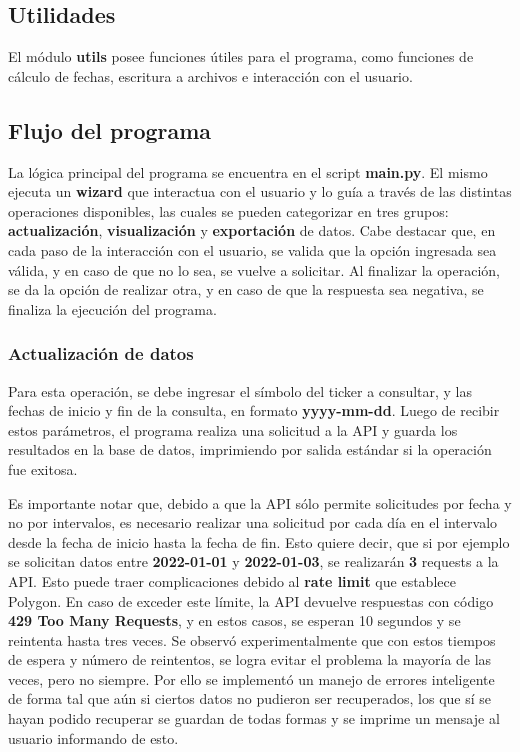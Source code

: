 \documentclass{article}
\begin{document}
\subsection{Utilidades}
El módulo \textbf{utils} posee funciones útiles para el programa, como funciones de cálculo de
fechas, escritura a archivos e interacción con el usuario.

\subsection{Flujo del programa}
La lógica principal del programa se encuentra en el script \textbf{main.py}. El mismo ejecuta
un \textbf{wizard} que interactua con el usuario y lo guía a través de las distintas operaciones
disponibles, las cuales se pueden categorizar en tres grupos: \textbf{actualización},
\textbf{visualización} y \textbf{exportación} de datos. Cabe destacar que, en cada paso de la
interacción con el usuario, se valida que la opción ingresada sea válida, y en caso de que no lo sea,
se vuelve a solicitar. Al finalizar la operación, se da la opción de realizar otra, y en caso de que
la respuesta sea negativa, se finaliza la ejecución del programa.

\subsubsection{Actualización de datos}
Para esta operación, se debe ingresar el símbolo del ticker a consultar, y las fechas
de inicio y fin de la consulta, en formato \textbf{yyyy-mm-dd}. Luego de recibir estos parámetros,
el programa realiza una solicitud a la API y guarda los resultados en la base de datos, imprimiendo
por salida estándar si la operación fue exitosa.

Es importante notar que, debido a que la API sólo
permite solicitudes por fecha y no por intervalos, es necesario realizar una solicitud por cada día
en el intervalo desde la fecha de inicio hasta la fecha de fin. Esto quiere decir, que si por ejemplo
se solicitan datos entre \textbf{2022-01-01} y \textbf{2022-01-03}, se realizarán \textbf{3} requests
a la API. Esto puede traer complicaciones debido al \textbf{rate limit} que establece Polygon. En
caso de exceder este límite, la API devuelve respuestas con código \textbf{429 Too Many Requests},
y en estos casos, se esperan 10 segundos y se reintenta hasta tres veces. Se observó experimentalmente
que con estos tiempos de espera y número de reintentos, se logra evitar el problema la mayoría de las
veces, pero no siempre. Por ello se implementó un manejo de errores inteligente
de forma tal que aún si ciertos datos no pudieron ser recuperados, los que sí se hayan podido recuperar
se guardan de todas formas y se imprime un mensaje al usuario informando de esto.
\end{document}
